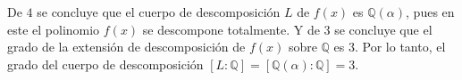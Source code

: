 \begin{solucion}
De $4$ se concluye que el cuerpo de descomposición $L$ de $f(x)$ es $\mathbb{Q}(\alpha)$, pues en este el polinomio $f(x)$ se descompone totalmente. Y de $3$ se concluye que el grado de la extensión de descomposición de $f(x)$ sobre $\mathbb{Q}$ es $3$. Por lo tanto, el grado del cuerpo de descomposición $[L:\mathbb{Q}] = [\mathbb{Q}(\alpha):\mathbb{Q}] = 3$.





\end{solucion}